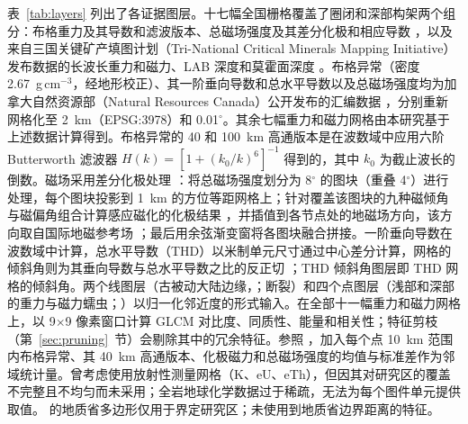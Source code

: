 \documentclass[pdflatex,sn-apa]{sn-jnl}
\begin{document}
表~\ref{tab:layers} 列出了各证据图层。十七幅全国栅格覆盖了圈闭和深部构架两个组分：布格重力及其导数和滤波版本、总磁场强度及其差分化极和相应导数 \citep{Jobin2017,Miles2016}，以及来自三国关键矿产填图计划（Tri-National Critical Minerals Mapping Initiative）发布数据的长波长重力和磁力、LAB 深度和莫霍面深度 \citep{McCafferty2023}。布格异常（密度 2.67~g\,cm$^{-3}$，经地形校正）、其一阶垂向导数和总水平导数以及总磁场强度均为加拿大自然资源部（Natural Resources Canada）公开发布的汇编数据 \citep{Jobin2017,Miles2016}，分别重新网格化至 2~km（EPSG:3978）和 0.01$^\circ$。其余七幅重力和磁力网格由本研究基于上述数据计算得到。布格异常的 40 和 100~km 高通版本是在波数域中应用六阶 Butterworth 滤波器 $H(k) = [1 + (k_0/k)^6]^{-1}$ 得到的，其中 $k_0$ 为截止波长的倒数。磁场采用差分化极处理 \citep{ArkaniHamed1988,CooperCowan2005}：将总磁场强度划分为 8$^\circ$ 的图块（重叠 4$^\circ$）进行处理，每个图块投影到 1~km 的方位等距网格上；针对覆盖该图块的九种磁倾角与磁偏角组合计算感应磁化的化极结果 \citep{Blakely1995}，并插值到各节点处的地磁场方向，该方向取自国际地磁参考场 \citep[IGRF-13，历元 2020.0；][]{Alken2021}；最后用余弦渐变窗将各图块融合拼接。一阶垂向导数在波数域中计算，总水平导数（THD）以米制单元尺寸通过中心差分计算，网格的倾斜角则为其垂向导数与总水平导数之比的反正切 \citep{Miller1994,Verduzco2004}；THD 倾斜角图层即 THD 网格的倾斜角。两个线图层（古被动大陆边缘，\citealp{BradleyDC2008}；断裂）和四个点图层（浅部和深部的重力与磁力蠕虫；\citealp{McCafferty2023}）以归一化邻近度的形式输入。在全部十一幅重力和磁力网格上，以 9$\times$9 像素窗口计算 GLCM 对比度、同质性、能量和相关性；特征剪枝（第~\ref{sec:pruning}~节）会剔除其中的冗余特征。参照 \citet{Luo2026}，加入每个点 10~km 范围内布格异常、其 40~km 高通版本、化极磁力和总磁场强度的均值与标准差作为邻域统计量。曾考虑使用放射性测量网格（K、eU、eTh），但因其对研究区的覆盖不完整且不均匀而未采用；全岩地球化学数据过于稀疏，无法为每个图件单元提供取值。\citet{Wheeler1996} 的地质省多边形仅用于界定研究区；未使用到地质省边界距离的特征。
\end{document}
